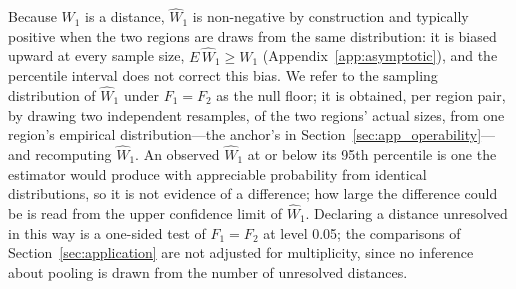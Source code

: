 \documentclass[AMA,Times1COL]{WileyNJDv5}
\begin{document}
Because $W_1$ is a distance, $\widehat{W}_1$ is non-negative by construction and typically positive when the two regions are draws from the same distribution: it is biased upward at every sample size, $E\,\widehat{W}_1 \geq W_1$ (Appendix~\ref{app:asymptotic}), and the percentile interval does not correct this bias. %
We refer to the sampling distribution of $\widehat{W}_1$ under $F_1 = F_2$ as the null floor; it is obtained, per region pair, by drawing two independent resamples, of the two regions' actual sizes, from one region's empirical distribution---the anchor's in Section~\ref{sec:app_operability}---and recomputing $\widehat{W}_1$. An observed $\widehat{W}_1$ at or below its 95th percentile is one the estimator would produce with appreciable probability from identical distributions, so it is not evidence of a difference; how large the difference could be is read from the upper confidence limit of $\widehat{W}_1$. Declaring a distance unresolved in this way is a one-sided test of $F_1 = F_2$ at level 0.05; the comparisons of Section~\ref{sec:application} are not adjusted for multiplicity, since no inference about pooling is drawn from the number of unresolved distances.
\end{document}
